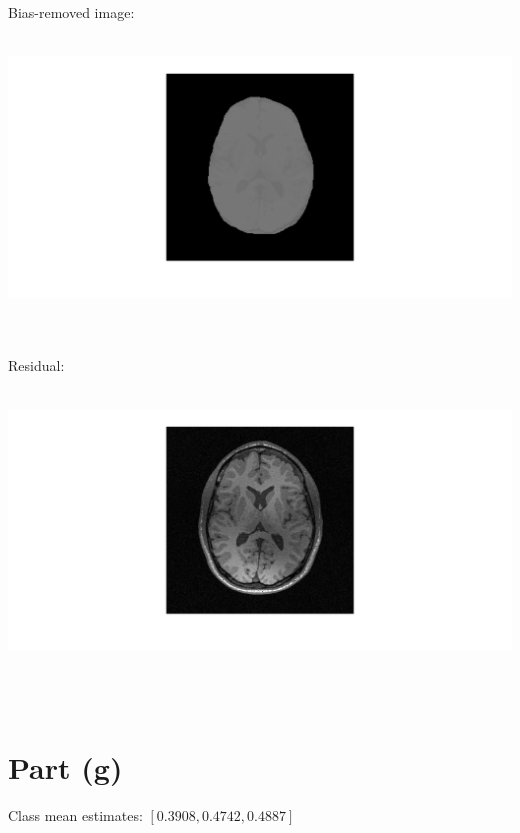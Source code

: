 \documentclass[11pt]{article}
\begin{document}
Bias-removed image: \\ \\	
\centerline{\includegraphics[scale=0.5]{biasRemoved}} \\ \\
Residual: \\ \\
\centerline{\includegraphics[scale=0.5]{residual}} \\ \\

\section*{Part (g)}
Class mean estimates: $[0.3908, 0.4742, 0.4887]$
\end{document}
